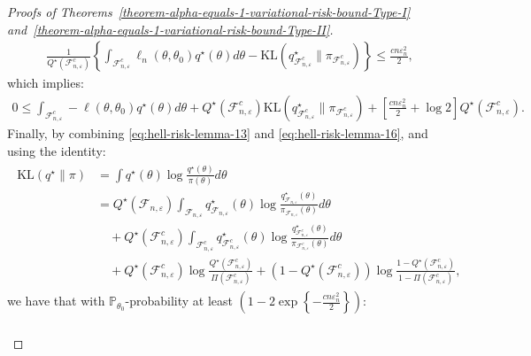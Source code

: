 \documentclass[12pt]{article}
\numberwithin{equation}{section}
\begin{document}
\begin{proof}[Proofs of Theorems~\ref{theorem-alpha-equals-1-variational-risk-bound-Type-I} and~\ref{theorem-alpha-equals-1-variational-risk-bound-Type-II}]
\begin{align}\label{eq:hell-risk-lemma-15}
    \frac{1}{Q^{\star}(\mathcal{F}_{n, \varepsilon}^{c})}\left\{\int_{\mathcal{F}_{n, \varepsilon}^{c}}\ell_{n}(\theta, \theta_0)q^{\star}(\theta)d\theta -\mathrm{KL}(q^{\star}_{\mathcal{F}_{n, \varepsilon}^{c}}\parallel \pi_{\mathcal{F}_{n, \varepsilon}^{c}})\right\} \leq \frac{c n \varepsilon_n^2}{2},
\end{align}
which implies:
\begin{align}\label{eq:hell-risk-lemma-16}
    0 \leq \int_{\mathcal{F}_{n, \varepsilon}^{c}}-\ell(\theta, \theta_0)q^{\star}(\theta)d\theta + Q^{\star}(\mathcal{F}_{n, \varepsilon}^{c})\mathrm{KL}(q^{\star}_{\mathcal{F}_{n, \varepsilon}^{c}}\parallel \pi_{\mathcal{F}_{n, \varepsilon}^{c}}) + \left[\frac{c n \varepsilon_n^2}{2}+\log 2\right]Q^{\star}(\mathcal{F}_{n, \varepsilon}^{c}).
\end{align}
Finally, by combining \eqref{eq:hell-risk-lemma-13} and \eqref{eq:hell-risk-lemma-16}, and using the identity:
\begin{align}\label{eq:hell-risk-lemma-17}
    \begin{split}
        \mathrm{KL}(q^{\star}\parallel \pi) &= \int q^{\star}(\theta) \log \frac{q^{\star}(\theta)}{\pi(\theta)}d\theta\\
        &= Q^{\star}(\mathcal{F}_{n, \varepsilon})\int_{\mathcal{F}_{n, \varepsilon}}q^{\star}_{\mathcal{F}_{n, \varepsilon}}(\theta)\log \frac{q^{\star}_{\mathcal{F}_{n, \varepsilon}}(\theta)}{\pi_{\mathcal{F}_{n, \varepsilon}}(\theta)}d\theta\\
        &\quad + Q^{\star}(\mathcal{F}_{n, \varepsilon}^{c})\int_{\mathcal{F}_{n, \varepsilon}^{c}}q^{\star}_{\mathcal{F}_{n, \varepsilon}^{c}}(\theta)\log \frac{q^{\star}_{\mathcal{F}_{n, \varepsilon}^c}(\theta)}{\pi_{\mathcal{F}_{n, \varepsilon}^{c}}(\theta)}d\theta\\
        &\quad + Q^{\star}(\mathcal{F}_{n, \varepsilon}^{c})\log \frac{Q^{\star}(\mathcal{F}_{n, \varepsilon}^{c})}{\Pi(\mathcal{F}_{n, \varepsilon}^{c})} + (1 - Q^{\star}(\mathcal{F}_{n, \varepsilon}^{c}))\log\frac{1 - Q^{\star}(\mathcal{F}_{n, \varepsilon}^{c})}{1 - \Pi(\mathcal{F}_{n, \varepsilon}^{c})},
    \end{split}
\end{align}
we have that with $\mathbb{P}_{\theta_0}$-probability at least $\left(1 - 2\exp\left\{-\tfrac{c n \varepsilon_n^2}{2}\right\}\right)$:
\begin{align}
\label{eq:hell-risk-lemma-18}
\begin{split}

\end{split}
\end{align}
\end{proof}
\end{document}
